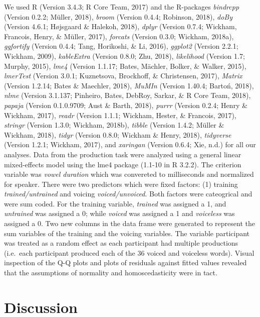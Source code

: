 \documentclass[man]{apa6}
\theoremstyle{definition}
\theoremstyle{definition}
\theoremstyle{definition}
\theoremstyle{remark}
\begin{document}
We used R (Version 3.4.3; R Core Team, 2017) and the R-packages
\emph{bindrcpp} (Version 0.2.2; Müller, 2018), \emph{broom} (Version
0.4.4; Robinson, 2018), \emph{doBy} (Version 4.6.1; Højsgaard \&
Halekoh, 2018), \emph{dplyr} (Version 0.7.4; Wickham, Francois, Henry,
\& Müller, 2017), \emph{forcats} (Version 0.3.0; Wickham, 2018a),
\emph{ggfortify} (Version 0.4.4; Tang, Horikoshi, \& Li, 2016),
\emph{ggplot2} (Version 2.2.1; Wickham, 2009), \emph{kableExtra}
(Version 0.8.0; Zhu, 2018), \emph{likelihood} (Version 1.7; Murphy,
2015), \emph{lme4} (Version 1.1.17; Bates, Mächler, Bolker, \& Walker,
2015), \emph{lmerTest} (Version 3.0.1; Kuznetsova, Brockhoff, \&
Christensen, 2017), \emph{Matrix} (Version 1.2.14; Bates \& Maechler,
2018), \emph{MuMIn} (Version 1.40.4; Bartoń, 2018), \emph{nlme} (Version
3.1.137; Pinheiro, Bates, DebRoy, Sarkar, \& R Core Team, 2018),
\emph{papaja} (Version 0.1.0.9709; Aust \& Barth, 2018), \emph{purrr}
(Version 0.2.4; Henry \& Wickham, 2017), \emph{readr} (Version 1.1.1;
Wickham, Hester, \& Francois, 2017), \emph{stringr} (Version 1.3.0;
Wickham, 2018b), \emph{tibble} (Version 1.4.2; Müller \& Wickham, 2018),
\emph{tidyr} (Version 0.8.0; Wickham \& Henry, 2018), \emph{tidyverse}
(Version 1.2.1; Wickham, 2017), and \emph{xaringan} (Version 0.6.4; Xie,
n.d.) for all our analyses. Data from the production task were analyzed
using a general linear mixed-effects model using the lme4 package
(1.1-10 in R 3.2.2). The criterion variable was \emph{vowel duration}
which was convereted to milliseconds and normalized for speaker. There
were two predictors which were fixed factors: (1) training
\emph{trained/untrained} and voicing \emph{voiced/unvoiced}. Both
factors were cateogrical and were sum coded. For the training variable,
\emph{trained} was assigned a 1, and \emph{untrained} was assigned a 0;
while \emph{voiced} was assigned a 1 and \emph{voiceless} was assigned a
0. Two new columns in the data frame were generated to represent the sum
variables of the training and the voicing variables. The variable
participant was treated as a random effect as each participant had
multiple productions (i.e.~each participant produced each of the 36
voiced and voiceless words). Visual inspection of the Q-Q plots and
plots of residuals against fitted values revealed that the assumptions
of normality and homoscedasticity were in tact.

\section{Discussion}\label{discussion}
\end{document}
